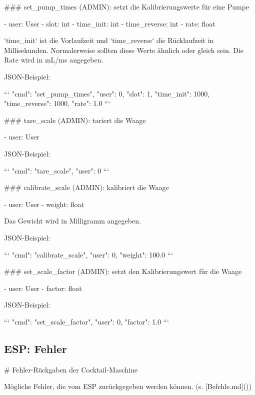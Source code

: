 ### set_pump_times (ADMIN): setzt die Kalibrierungswerte für eine Pumpe

- user: User
- slot: int
- time_init: int
- time_reverse: int
- rate: float

`time_init` ist die Vorlaufzeit und `time_reverse` die Rücklaufzeit in Millisekunden. Normalerweise sollten diese Werte ähnlich oder gleich sein. Die Rate wird in mL/ms angegeben.

JSON-Beispiel:

```
{"cmd": "set_pump_times", "user": 0, "slot": 1, "time_init": 1000, "time_reverse": 1000, "rate": 1.0}
```

### tare_scale (ADMIN): tariert die Waage

- user: User

JSON-Beispiel:

```
{"cmd": "tare_scale", "user": 0}
```

### calibrate_scale (ADMIN): kalibriert die Waage

- user: User
- weight: float

Das Gewicht wird in Milligramm angegeben.

JSON-Beispiel:

```
{"cmd": "calibrate_scale", "user": 0, "weight": 100.0}
```

### set_scale_factor (ADMIN): setzt den Kalibrierungswert für die Waage

- user: User
- factor: float

JSON-Beispiel:

```
{"cmd": "set_scale_factor", "user": 0, "factor": 1.0}
```

\subsection{ESP: Fehler}
# Fehler-Rückgaben der Cocktail-Maschine

Mögliche Fehler, die vom ESP zurückgegeben werden können. (s. [Befehle.md]())

